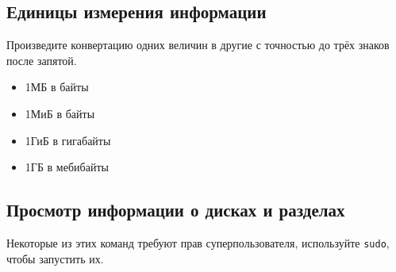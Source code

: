 \documentclass{article}
\begin{document}
\newpage


\subsection{Единицы измерения информации}
Произведите конвертацию одних величин в другие с точностью до трёх знаков после запятой.
\begin{itemize}
\item 1МБ в байты
\item 1МиБ в байты
\item 1ГиБ в гигабайты
\item 1ГБ в мебибайты
\end{itemize}


\subsection{Просмотр информации о дисках и разделах}
Некоторые из этих команд требуют прав суперпользователя, используйте \texttt{sudo}, чтобы запустить их.
\end{document}
